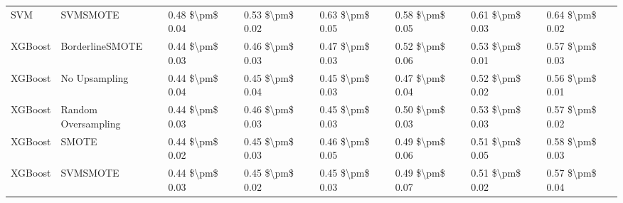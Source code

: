 \begin{tabular}{llllllll}
                            SVM &                      SVMSMOTE & 0.48 \$\textbackslash pm\$ 0.04 &           0.53 \$\textbackslash pm\$ 0.02 &       0.63 \$\textbackslash pm\$ 0.05 &        0.58 \$\textbackslash pm\$ 0.05 &                         0.61 \$\textbackslash pm\$ 0.03 &     0.64 \$\textbackslash pm\$ 0.02 \\
                        XGBoost &               BorderlineSMOTE & 0.44 \$\textbackslash pm\$ 0.03 &           0.46 \$\textbackslash pm\$ 0.03 &       0.47 \$\textbackslash pm\$ 0.03 &        0.52 \$\textbackslash pm\$ 0.06 &                         0.53 \$\textbackslash pm\$ 0.01 &     0.57 \$\textbackslash pm\$ 0.03 \\
                        XGBoost &                 No Upsampling & 0.44 \$\textbackslash pm\$ 0.04 &           0.45 \$\textbackslash pm\$ 0.04 &       0.45 \$\textbackslash pm\$ 0.03 &        0.47 \$\textbackslash pm\$ 0.04 &                         0.52 \$\textbackslash pm\$ 0.02 &     0.56 \$\textbackslash pm\$ 0.01 \\
                        XGBoost &           Random Oversampling & 0.44 \$\textbackslash pm\$ 0.03 &           0.46 \$\textbackslash pm\$ 0.03 &       0.45 \$\textbackslash pm\$ 0.03 &        0.50 \$\textbackslash pm\$ 0.03 &                         0.53 \$\textbackslash pm\$ 0.03 &     0.57 \$\textbackslash pm\$ 0.02 \\
                        XGBoost &                         SMOTE & 0.44 \$\textbackslash pm\$ 0.02 &           0.45 \$\textbackslash pm\$ 0.03 &       0.46 \$\textbackslash pm\$ 0.05 &        0.49 \$\textbackslash pm\$ 0.06 &                         0.51 \$\textbackslash pm\$ 0.05 &     0.58 \$\textbackslash pm\$ 0.03 \\
                        XGBoost &                      SVMSMOTE & 0.44 \$\textbackslash pm\$ 0.03 &           0.45 \$\textbackslash pm\$ 0.02 &       0.45 \$\textbackslash pm\$ 0.03 &        0.49 \$\textbackslash pm\$ 0.07 &                         0.51 \$\textbackslash pm\$ 0.02 &     0.57 \$\textbackslash pm\$ 0.04 \\
\bottomrule
\end{tabular}
